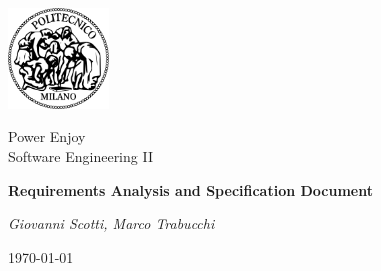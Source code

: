\documentclass[a4paper,12pt]{article}
\begin{document}
\begin{titlepage}
\centering
\includegraphics[width=0.20\textwidth]{./logo_poli}\par
	\vspace{1.5cm}
	{\Large {Power Enjoy \\ 
		Software Engineering II} \par}
	\vspace{1.5cm}
	{\LARGE \textbf{Requirements Analysis and Specification Document} \par}
	\vspace{1.5cm}
	{\Large\itshape Giovanni Scotti, Marco Trabucchi\par}
	\vspace{2cm}
	\vfill
	{\large \today \par}
\end{titlepage}
\end{document}
